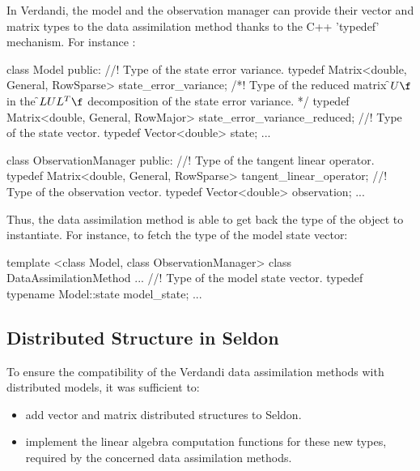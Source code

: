 In Verdandi, the model and the observation manager can provide their vector and matrix types to the data assimilation method thanks to the C++ 'typedef' mechanism. For instance :


\begin{frame_cpp}
class Model
{
    public:
        //! Type of the state error variance.
        typedef Matrix<double, General, RowSparse> state_error_variance;
        /*! \brief Type of the reduced matrix \f$U\f$ in the \f$LUL^T\f$
        decomposition of the state error variance. */
        typedef Matrix<double, General, RowMajor> state_error_variance_reduced;
        //! Type of the state vector.
        typedef Vector<double> state;
	...
}
\end{frame_cpp}


\begin{frame_cpp}
class ObservationManager
{
    public:
        //! Type of the tangent linear operator.
        typedef Matrix<double, General, RowSparse> tangent_linear_operator;
        //! Type of the observation vector.
        typedef Vector<double> observation;
	...
}
\end{frame_cpp}


Thus, the data assimilation method is able to get back the type of the object to instantiate. For instance, to fetch the type of the model state vector:

\begin{frame_cpp}
template <class Model, class ObservationManager>
class DataAssimilationMethod
{
...
        //! Type of the model state vector.
        typedef typename Model::state model_state;
...
}
\end{frame_cpp}



\hypertarget{seq-par-ds}{}\subsection{Distributed Structure in Seldon}\label{seq-par-ds}


To ensure the compatibility of the Verdandi data assimilation methods with distributed models,  it was sufficient to:

\begin{itemize}

\item add vector and matrix distributed structures to Seldon.

\item implement the linear algebra computation functions for these new types, required by the concerned data assimilation methods.

\end{itemize}

